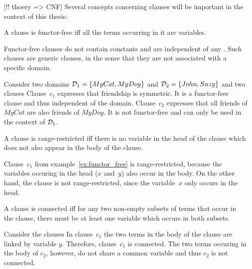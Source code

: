 [!! thoery => CNF] Several concepts concerning clauses will be important in the context of this thesis:
\begin{definition}
A clause is functor-free iff all the terms occurring in it are variables.
\end{definition}
Functor-free clauses do not contain constants and are independent of any . Such clauses are generic clauses, in the sense that they are not associated with a specific domain.
\begin{example}
\label{ex:functor_free}
Consider two domains $\mathcal{D}_1 = \{MyCat, MyDog\}$ and $\mathcal{D}_2 = \{John, Suzy\}$ and two clauses 
Clause~$c_1$ expresses that friendship is symmetric. It is a functor-free clause and thus independent of the domain. Clause~$c_2$ expresses that all friends of $MyCat$ are also friends of $MyDog$. It is not functor-free and can only be used in the context of $\mathcal{D}_1$. 
\end{example}

\begin{definition}
A clause is range-restricted iff there is no variable in the head of the clause which does not also appear in the body of the clause.
\end{definition}

\begin{example}
Clause~$c_1$ from example~\ref{ex:functor_free} is range-restricted, because the variables occuring in the head ($x$ and~$y$) also occur in the body. On the other hand, the clause  is not range-restricted, since the variable~$x$ only occurs in the head.
\end{example}

\begin{definition}
A clause is connected iff for any two non-empty subsets of terms that occur in the clause, there must be at least one variable which occurs in both subsets.
\end{definition}

\begin{example}
Consider the clauses  In clause~$c_1$ the two terms in the body of the clause are linked by variable $y$. Therefore, clause~$c_1$ is connected. The two terms occuring in the body of $c_2$, however, do not share a common variable and thus $c_2$ is not connected.
\end{example}

